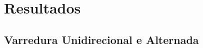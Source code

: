 \section{Resultados} \label{sec:resultado}

\subsection{Varredura Unidirecional e Alternada}

    {}
